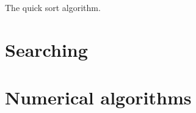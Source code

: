\begin{algorithm}[H]
	{
		
	}
	\caption{The quick sort algorithm.}
	\label{alg:quick-sort}
\end{algorithm}




\section{Searching}



\section{Numerical algorithms}





